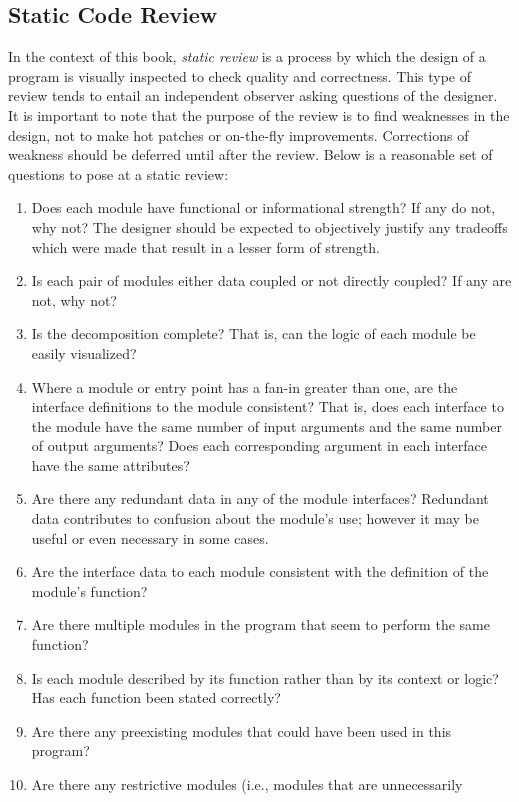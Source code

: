 \documentclass[format.tex]{subfiles}
\begin{document}
\subsection{Static Code Review}
In the context of this book, {\it static review} is a process by which the
design of a program is visually inspected to check quality and correctness.
This type of review tends to entail an independent observer asking questions of
the designer. It is important to note that the purpose of the review is to find
weaknesses in the design, not to make hot patches or on-the-fly improvements.
Corrections of weakness should be deferred until after the review. Below is a
reasonable set of questions to pose at a static review:

\begin{enumerate}
\item Does each module have functional or informational strength? If any do
  not, why not? The designer should be expected to objectively justify any
  tradeoffs which were made that result in a lesser form of strength.
\item Is each pair of modules either data coupled or not directly coupled? If
  any are not, why not?
\item Is the decomposition complete? That is, can the logic of each module be
  easily visualized?
\item Where a module or entry point has a fan-in greater than one, are the
  interface definitions to the module consistent? That is, does each interface
  to the module have the same number of input arguments and the same number of
  output arguments? Does each corresponding argument in each interface have the
  same attributes?
\item Are there any redundant data in any of the module interfaces? Redundant
  data contributes to confusion about the module's use; however it may be
  useful or even necessary in some cases.
\item Are the interface data to each module consistent with the definition of
  the module's function?
\item Are there multiple modules in the program that seem to perform the same
  function?
\item Is each module described by its function rather than by its context or
  logic? Has each function been stated correctly?
\item Are there any preexisting modules that could have been used in this
  program?
\item Are there any restrictive modules (i.e., modules that are unnecessarily

\end{enumerate}
\end{document}
